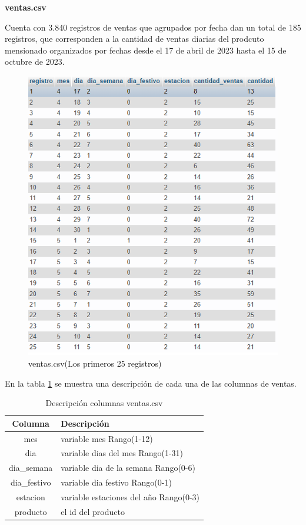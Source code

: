 \textbf{ventas.csv}

Cuenta con 3.840 registros de ventas que agrupados por fecha dan un total de 185 registros, que corresponden a la cantidad de ventas diarias del prodcuto mensionado organizados por fechas desde el 17 de abril de 2023 hasta el 15 de octubre de 2023.




\begin{figure}[H]
  \begin{center}
    \includegraphics[scale=0.90]{./registro_ventas.png}
    \caption{ventas.csv(Los primeros 25 registros)}
    \label{fig:priemeros_5productos}
  \end{center}
\end{figure}
\begin{table}[H]
  

  En la tabla \ref{tab:ventas} se muestra una descripción de cada una de las columnas de ventas.

  \begin{tabular}{|c|l|}  %
    \hline
    \rowcolor{gray!50} \textbf{Columna} & \textbf{Descripción} \\
    \hline
    mes &  variable mes Rango(1-12)\\
    dia & variable dias del mes Rango(1-31)\\
    dia\_semana & variable dia de la semana Rango(0-6)\\
    dia\_festivo & variable dia festivo Rango(0-1)\\
    estacion & variable estaciones del año Rango(0-3)\\
    producto & el id del producto\\
    \hline
  \end{tabular}
  \centering
  \caption{ Descripción columnas ventas.csv}
  \label{tab:ventas} %
\end{table}

